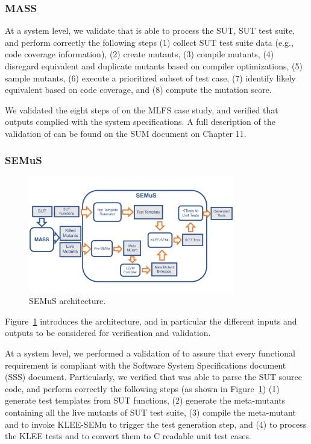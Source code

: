\subsubsection{MASS}

At a system level, we validate that \MASS is able to process the SUT, SUT test suite, and perform correctly the following steps (1) collect SUT test suite data (e.g., code coverage information), (2) create mutants, (3) compile mutants, (4) disregard equivalent and duplicate mutants based on compiler optimizations, (5) sample mutants, (6) execute a prioritized subset of test case, (7) identify likely equivalent based on code coverage, and (8) compute the mutation score.

We validated the eight steps of \MASS on the MLFS case study, and verified that outputs complied with the system specifications. A full description of the validation of \MASS can be found on the SUM document on Chapter 11.

\subsubsection{SEMuS}

\begin{figure}[t]
  \centering
  \includegraphics[width=0.8\textwidth]{images/semus-architecture.pdf}
      \caption{SEMuS architecture.}
      \label{fig:semus}
\end{figure}

Figure~\ref{fig:semus} introduces the \SEMUS architecture, and in particular the different inputs and outputs to be considered for verification and validation.

At a system level, we performed a validation of \SEMUS to assure that every functional requirement is compliant with the Software System Specifications document (SSS) document. Particularly, we verified that \SEMUS was able to parse the SUT source code, and perform correctly the following steps (as shown in Figure~\ref{fig:semus}) (1) generate test templates from SUT functions, (2) generate the meta-mutants containing all the live mutants of SUT test suite, (3) compile the meta-mutant and to invoke KLEE-SEMu to trigger the test generation step, and (4) to process the KLEE tests and to convert them to C readable unit test cases.


